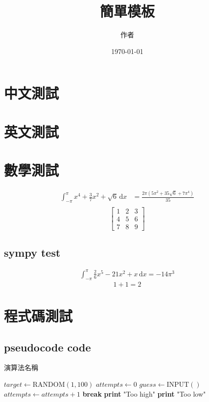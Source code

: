\documentclass[12pt]{article}
\title{簡單模板}
\author{作者}
\date{\today}
\begin{document}
\maketitle
\tableofcontents


\section{中文測試}
\zhlipsum[1]
\section{英文測試}
\lipsum[1]
\section{數學測試}
\begin{align}
	\int_{-\pi }^{\pi } x^{4} + \frac{3}{7}x^2 + \sqrt{6}   \,\mathrm{d}x & = \frac{2 \pi (5 \pi^{2} + 35 \sqrt{6} + 7 \pi^{4})}{35} \\
\end{align}
\[
	\begin{bmatrix}
		1 & 2 & 3 \\
		4 & 5 & 6 \\
		7 & 8 & 9
	\end{bmatrix}
\]
\subsection{sympy test}
\begin{align}
	\int_{-\pi }^{\pi } \frac{2}{6}x^{5} -21x^2 + x \,\mathrm{d}x = - 14 \pi^{3}
\end{align}
\[
	1+1 = 2
\]

\section{程式碼測試}
\subsection{pseudocode code}
\begin{algorithm}[b]
	\caption{演算法名稱}\label{alg:guessnumber}
	\begin{algorithmic}[1]
		\State \(target \gets \text{RANDOM}(1, 100) \)
		\State \(attempts \gets 0\)
		\State \(guess \gets \text{INPUT}() \)
		\State \(attempts \gets attempts + 1\)
		\State \textbf{break}
		\State \textbf{print} "Too high"
		\Else
		\State \textbf{print} "Too low"
		\EndIf
		\EndWhile
	\end{algorithmic}
\end{algorithm}
\end{document}
